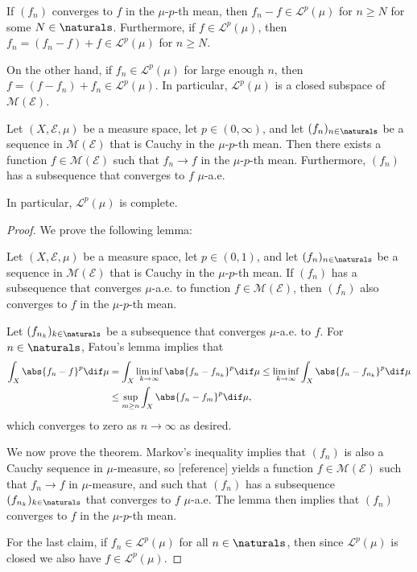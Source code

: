 \documentclass[article, a4paper, 11pt, oneside]{memoir}
\numberwithin{equation}{chapter}
\newcommand{\calE}{\mathcal{E}}
\newcommand{\calL}{\mathcal{L}}
\newcommand{\measurable}{\mathcal{M}}
\newenvironment{displaytheorem}{%
	\begin{displayquote}\itshape%
}{%
	\end{displayquote}%
}
\begin{document}
\begin{remark}
    If $(f_n)$ converges to $f$ in the $\mu$-$p$-th mean, then $f_n - f \in \calL^p(\mu)$ for $n \geq N$ for some $N \in \naturals$. Furthermore, if $f \in \calL^p(\mu)$, then $f_n = (f_n - f) + f \in \calL^p(\mu)$ for $n \geq N$.
    
    On the other hand, if $f_n \in \calL^p(\mu)$ for large enough $n$, then $f = (f - f_n) + f_n \in \calL^p(\mu)$. In particular, $\calL^p(\mu)$ is a closed subspace of $\measurable(\calE)$.
\end{remark}


\begin{theorem}
    Let $(X,\calE,\mu)$ be a measure space, let $p \in (0,\infty)$, and let $(f_n)_{n\in\naturals}$ be a sequence in $\measurable(\calE)$ that is Cauchy in the $\mu$-$p$-th mean. Then there exists a function $f \in \measurable(\calE)$ such that $f_n \to f$ in the $\mu$-$p$-th mean. Furthermore, $(f_n)$ has a subsequence that converges to $f$ $\mu$-a.e.

    In particular, $\calL^p(\mu)$ is complete.
\end{theorem}

\begin{proof}
    We prove the following lemma:
    \begin{displaytheorem}
        Let $(X,\calE,\mu)$ be a measure space, let $p \in (0,1)$, and let $(f_n)_{n\in\naturals}$ be a sequence in $\measurable(\calE)$ that is Cauchy in the $\mu$-$p$-th mean. If $(f_n)$ has a subsequence that converges $\mu$-a.e. to function $f \in \measurable(\calE)$, then $(f_n)$ also converges to $f$ in the $\mu$-$p$-th mean.
    \end{displaytheorem}
    Let $(f_{n_k})_{k\in\naturals}$ be a subsequence that converges $\mu$-a.e. to $f$. For $n \in \naturals$, Fatou's lemma implies that
    \begin{align*}
        \int_X \abs{f_n - f}^p \dif\mu
            &= \int_X \liminf_{k\to\infty} \abs{f_n - f_{n_k}}^p \dif\mu
             \leq \liminf_{k\to\infty} \int_X \abs{f_n - f_{n_k}}^p \dif\mu \\
            &\leq \sup_{m \geq n} \int_X \abs{f_n - f_m}^p \dif\mu,
    \end{align*}
    which converges to zero as $n \to \infty$ as desired.

    We now prove the theorem. Markov's inequality implies that $(f_n)$ is also a Cauchy sequence in $\mu$-measure, so [reference] yields a function $f \in \measurable(\calE)$ such that $f_n \to f$ in $\mu$-measure, and such that $(f_n)$ has a subsequence $(f_{n_k})_{k\in\naturals}$ that converges to $f$ $\mu$-a.e. The lemma then implies that $(f_n)$ converges to $f$ in the $\mu$-$p$-th mean.

    For the last claim, if $f_n \in \calL^p(\mu)$ for all $n \in \naturals$, then since $\calL^p(\mu)$ is closed we also have $f \in \calL^p(\mu)$.
\end{proof}
\end{document}
